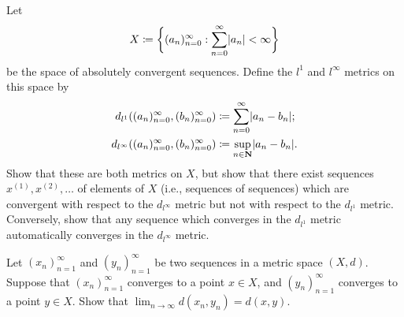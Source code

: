 \begin{exercise}\label{ex 1.1.15}
    Let
    \[
        X \coloneqq \bigg\{(a_n)_{n = 0}^\infty : \sum_{n = 0}^\infty \abs*{a_n} < \infty\bigg\}
    \]
    be the space of absolutely convergent sequences. Define the \(l^1\) and \(l^\infty\) metrics
    on this space by
    \begin{align*}
        d_{l^1}((a_n)_{n = 0}^\infty, (b_n)_{n = 0}^\infty)      & \coloneqq \sum_{n = 0}^\infty \abs*{a_n - b_n};     \\
        d_{l^\infty}((a_n)_{n = 0}^\infty, (b_n)_{n = 0}^\infty) & \coloneqq \sup_{n \in \mathbf{N}} \abs*{a_n - b_n}.
    \end{align*}
    Show that these are both metrics on \(X\), but show that there exist sequences \(x^{(1)}, x^{(2)}, \dots\) of elements of \(X\) (i.e., sequences of sequences) which are convergent with respect to the \(d_{l^\infty}\) metric but not with respect to the \(d_{l^1}\) metric.
    Conversely, show that any sequence which converges in the \(d_{l^1}\) metric automatically converges in the \(d_{l^\infty}\) metric.
\end{exercise}

\begin{exercise}\label{ex 1.1.16}
    Let \((x_n)_{n = 1}^\infty\) and \((y_n)_{n = 1}^\infty\) be two sequences in a metric space \((X, d)\).
    Suppose that \((x_n)_{n = 1}^\infty\) converges to a point \(x \in X\), and \((y_n)_{n = 1}^\infty\) converges to a point \(y \in X\).
    Show that \(\lim_{n \to \infty} d(x_n, y_n) = d(x, y)\).
\end{exercise}